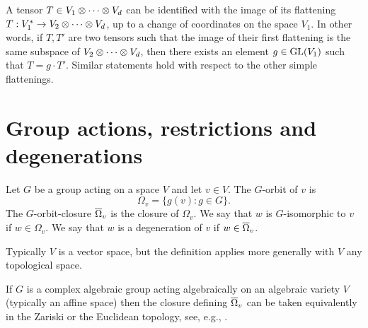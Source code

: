 A tensor $T \in V_1 \otimes \cdots \otimes V_d$ can be identified with the image of its flattening $T : V_1^* \to V_2 \otimes \cdots \otimes V_d$, up to a change of coordinates on the space $V_1$. In other words, if $T,T'$ are two tensors such that the image of their first flattening is the same subspace of $V_2 \otimes \cdots \otimes V_d$, then there exists an element $g \in \mathrm{GL}(V_1)$ such that $T = g\cdot T'$. Similar statements hold with respect to the other simple flattenings.


\section{Group actions, restrictions and degenerations}
\label{introduction-section-groupactions}

\begin{definition}
\label{introduction-definition-orbitsdegenerations}
Let $G$ be a group acting on a space $V$ and let $v \in V$. The $G$-orbit of $v$ is 
\[
\Omega_v = \{ g(v) : g \in G \}.
\]
The $G$-orbit-closure $\overline{\Omega}_v$ is the closure of $\Omega_v$. We say that $w$ is $G$-isomorphic to $v$ if $w \in \Omega_v$. We say that $w$ is a degeneration of $v$ if $w \in \overline{\Omega}_v$.

Typically $V$ is a vector space, but the definition applies more generally with $V$ any topological space.
\end{definition}

If $G$ is a complex algebraic group acting algebraically on an algebraic variety $V$ (typically an affine space) then the closure defining $\overline{\Omega}_v$ can be taken equivalently in the Zariski or the Euclidean topology, see, e.g., \cite[Thm. 2.33]{Mum76}.

